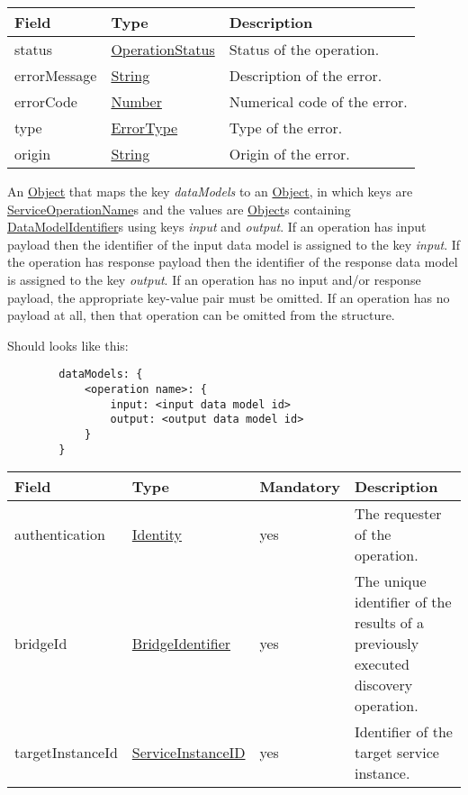 \documentclass[a4paper]{arrowhead}
\newcommand{\pref}[1]{{\textcolor{ArrowheadGrey}{\hyperref[sec:model:primitives:#1]{#1}}}}
\begin{document}

\begin{table}[ht!]
\begin{tabularx}{\textwidth}{| p{4.25cm} | p{3.5cm} | X |} \hline
\rowcolor{gray!33} Field & Type      & Description \\ \hline
status & \pref{OperationStatus} & Status of the operation. \\ \hline
errorMessage & \pref{String} & Description of the error. \\ \hline
errorCode &\pref{Number}  & Numerical code of the error. \\ \hline
type & \pref{ErrorType} & Type of the error. \\ \hline
origin & \pref{String} & Origin of the error. \\ \hline
\end{tabularx}
\end{table}


An \pref{Object} that maps the key \textit{dataModels} to an \pref{Object}, in which keys are \pref{ServiceOperationName}s and the values are \pref{Object}s containing \pref{DataModelIdentifier}s using keys \textit{input} and \textit{output}. If an operation has input payload then the identifier of the input data model is assigned to the key \textit{input}. If the operation has response payload then the identifier of the response data model is assigned to the key \textit{output}. If an operation has no input and/or response payload, the appropriate key-value pair must be omitted. If an operation has no payload at all, then that operation can be omitted from the structure.

\clearpage

Should looks like this:
\begin{verbatim}
        dataModels: { 
            <operation name>: { 
                input: <input data model id> 
                output: <output data model id>
            } 
        }
\end{verbatim}

 
\begin{table}[ht!]
\begin{tabularx}{\textwidth}{| p{3.9cm} | p{5.5cm} | p{1.3cm} | X |} \hline
\rowcolor{gray!33} Field & Type & Mandatory & Description \\ \hline
authentication & \hyperref[sec:model:Identity]{Identity} & yes & The requester of the operation. \\ \hline
bridgeId & \pref{BridgeIdentifier} & yes & The unique identifier of the results of a previously executed discovery operation. \\ \hline
targetInstanceId & \pref{ServiceInstanceID} & yes & Identifier of the target service instance. \\ \hline
\end{tabularx}
\end{table}
\end{document}
